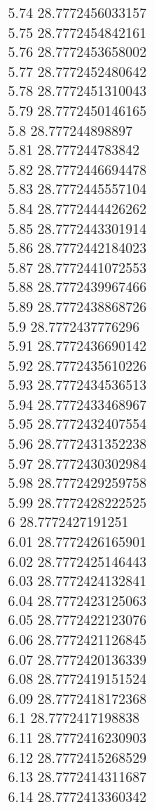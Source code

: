 {5.74	28.7772456033157\\
5.75	28.7772454842161\\
5.76	28.7772453658002\\
5.77	28.7772452480642\\
5.78	28.7772451310043\\
5.79	28.7772450146165\\
5.8	28.777244898897\\
5.81	28.777244783842\\
5.82	28.7772446694478\\
5.83	28.7772445557104\\
5.84	28.7772444426262\\
5.85	28.7772443301914\\
5.86	28.7772442184023\\
5.87	28.7772441072553\\
5.88	28.7772439967466\\
5.89	28.7772438868726\\
5.9	28.7772437776296\\
5.91	28.7772436690142\\
5.92	28.7772435610226\\
5.93	28.7772434536513\\
5.94	28.7772433468967\\
5.95	28.7772432407554\\
5.96	28.7772431352238\\
5.97	28.7772430302984\\
5.98	28.7772429259758\\
5.99	28.7772428222525\\
6	28.7772427191251\\
6.01	28.7772426165901\\
6.02	28.7772425146443\\
6.03	28.7772424132841\\
6.04	28.7772423125063\\
6.05	28.7772422123076\\
6.06	28.7772421126845\\
6.07	28.7772420136339\\
6.08	28.7772419151524\\
6.09	28.7772418172368\\
6.1	28.7772417198838\\
6.11	28.7772416230903\\
6.12	28.7772415268529\\
6.13	28.7772414311687\\
6.14	28.7772413360342\\
}
